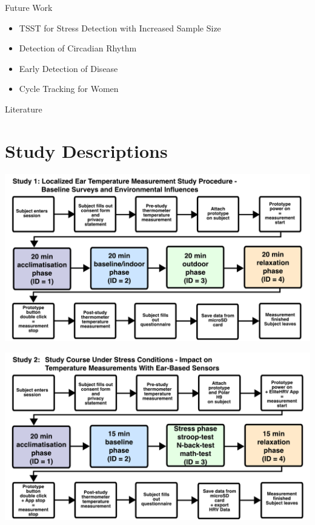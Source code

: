 \documentclass[en]{sdqbeamer}
\begin{document}
\begin{frame}{Future Work}
    \begin{itemize}
        \item TSST for Stress Detection with Increased Sample Size
        \item Detection of Circadian Rhythm
        \item Early Detection of Disease
        \item Cycle Tracking for Women
    \end{itemize}
\end{frame}

\appendix
\beginbackup


\begin{frame}{Literature}
    \printbibliography
\end{frame}

\section{Study Descriptions}
\begin{frame}
    \begin{center}
        \includegraphics[width=0.9\linewidth]{../thesis-doc/images/study1/Procedure.pdf}
    \end{center}
\end{frame}

\begin{frame}
    \begin{center}
        \includegraphics[width=0.9\linewidth]{../thesis-doc/images/study2/Procedure2.pdf}
    \end{center}
\end{frame}
\end{document}
